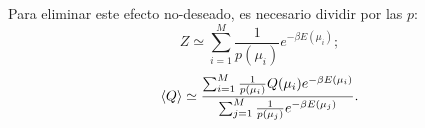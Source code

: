 Para eliminar este efecto no-deseado, es necesario dividir por las $p$:
\begin{equation}
 Z \simeq  \sum_{i=1}^M \frac{1}{p(\mu_i)} e^{-\beta
E(\mu_i)};
\end{equation}
\begin{equation}
 \left \langle Q \right \rangle \simeq \frac{\sum_{i=1}^M \textstyle \frac{1}{p(\mu_i)} Q(\mu_i) e^{-\beta
E(\mu_i)}}{\sum_{j=1}^M \textstyle \frac{1}{p(\mu_j)} e^{-\beta
E(\mu_j)}}.
\end{equation}


